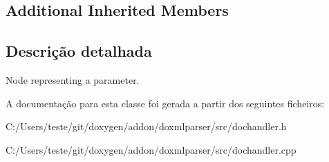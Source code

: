 \subsection*{Additional Inherited Members}


\subsection{Descrição detalhada}
Node representing a parameter. 



A documentação para esta classe foi gerada a partir dos seguintes ficheiros\-:\begin{DoxyCompactItemize}
\item 
C\-:/\-Users/teste/git/doxygen/addon/doxmlparser/src/dochandler.\-h\item 
C\-:/\-Users/teste/git/doxygen/addon/doxmlparser/src/dochandler.\-cpp\end{DoxyCompactItemize}
